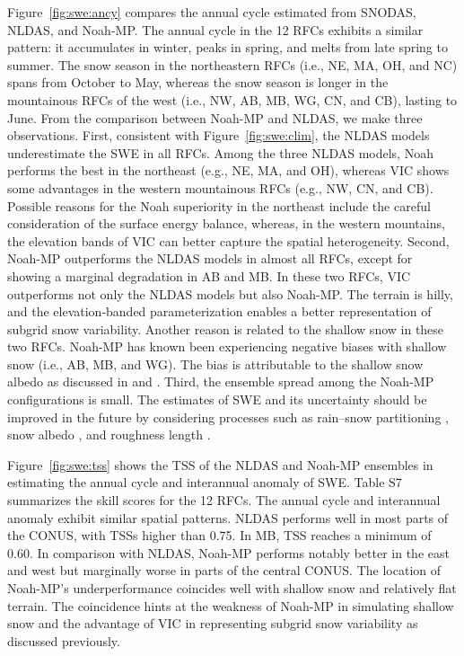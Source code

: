 \documentclass[essd, manuscript]{copernicus}
\begin{document}
Figure~\ref{fig:swe:ancy} compares the annual cycle estimated from SNODAS, NLDAS, and Noah-MP\@. The annual cycle in the 12 RFCs exhibits a similar pattern: it accumulates in winter, peaks in spring, and melts from late spring to summer. The snow season in the northeastern RFCs (i.e., NE, MA, OH, and NC) spans from October to May, whereas the snow season is longer in the mountainous RFCs of the west (i.e., NW, AB, MB, WG, CN, and CB), lasting to June. From the comparison between Noah-MP and NLDAS, we make three observations. First, consistent with Figure~\ref{fig:swe:clim}, the NLDAS models underestimate the SWE in all RFCs. Among the three NLDAS models, Noah performs the best in the northeast (e.g., NE, MA, and OH), whereas VIC shows some advantages in the western mountainous RFCs (e.g., NW, CN, and CB). Possible reasons for the Noah superiority in the northeast include the careful consideration of the surface energy balance, whereas, in the western mountains, the elevation bands of VIC can better capture the spatial heterogeneity. Second, Noah-MP outperforms the NLDAS models in almost all RFCs, except for showing a marginal degradation in AB and MB\@. In these two RFCs, VIC outperforms not only the NLDAS models but also Noah-MP\@. The terrain is hilly, and the elevation-banded parameterization enables a better representation of subgrid snow variability. Another reason is related to the shallow snow in these two RFCs. Noah-MP has known been experiencing negative biases with shallow snow (i.e., AB, MB, and WG). The bias is attributable to the shallow snow albedo as discussed in \citet{dang2019TC} and \citet{wang2020JHd}. Third, the ensemble spread among the Noah-MP configurations is small. The estimates of SWE and its uncertainty should be improved in the future by considering processes such as rain--snow partitioning \citet{wang2019GRL}, snow albedo \citep{wang2020JHd, dang2019TC}, and roughness length \citep{he2019JGRA}.

Figure~\ref{fig:swe:tss} shows the TSS of the NLDAS and Noah-MP ensembles in estimating the annual cycle and interannual anomaly of SWE\@. Table S7 summarizes the skill scores for the 12 RFCs. The annual cycle and interannual anomaly exhibit similar spatial patterns. NLDAS performs well in most parts of the CONUS, with TSSs higher than 0.75. In MB, TSS reaches a minimum of 0.60. In comparison with NLDAS, Noah-MP performs notably better in the east and west but marginally worse in parts of the central CONUS\@. The location of Noah-MP's underperformance coincides well with shallow snow and relatively flat terrain. The coincidence hints at the weakness of Noah-MP in simulating shallow snow and the advantage of VIC in representing subgrid snow variability as discussed previously.
\end{document}
